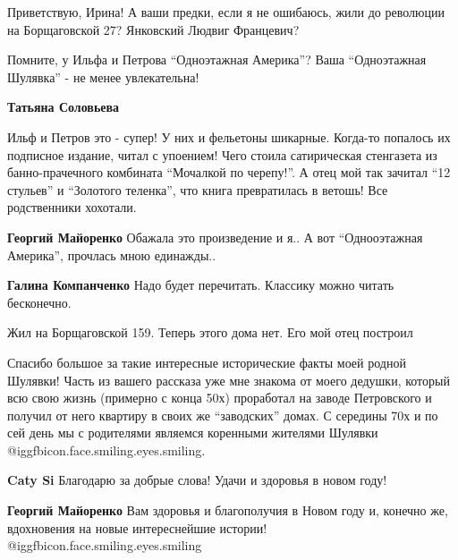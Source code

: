 \begin{itemize}
\begin{itemize}
Приветствую, Ирина! А ваши предки, если я не ошибаюсь, жили до революции на
Борщаговской 27? Янковский Людвиг Францевич?

\end{itemize} %


Помните, у Ильфа и Петрова \enquote{Одноэтажная Америка}? Ваша \enquote{Одноэтажная Шулявка} -
не менее увлекательна!

\begin{itemize} %
\textbf{Татьяна Соловьева} 

Ильф и Петров это - супер! У них и фельетоны шикарные. Когда-то попалось их
подписное издание, читал с упоением! Чего стоила сатирическая стенгазета из
банно-прачечного комбината \enquote{Мочалкой по черепу!}. А отец мой так
зачитал \enquote{12 стульев} и \enquote{Золотого теленка}, что книга
превратилась в ветошь! Все родственники хохотали.


\textbf{Георгий Майоренко} Обажала это произведение и я.. А вот \enquote{Однооэтажная Америка}, прочлась мною единажды..

\textbf{Галина Компанченко} Надо будет перечитать. Классику можно читать бесконечно.
\end{itemize} %

Жил на Борщаговской 159. Теперь этого дома нет. Его мой отец построил


Спасибо большое за такие интересные исторические факты моей родной Шулявки!
Часть из вашего рассказа уже мне знакома от моего дедушки, который всю свою
жизнь (примерно с конца 50х) проработал на заводе Петровского и получил от него
квартиру в своих же \enquote{заводских} домах. С середины 70х и по сей день мы с
родителями являемся коренными жителями Шулявки @igg{fbicon.face.smiling.eyes.smiling}.

\begin{itemize} %
\textbf{Caty Si} Благодарю за добрые слова! Удачи и здоровья в новом году!

\textbf{Георгий Майоренко} Вам здоровья и благополучия в Новом году и, конечно же, вдохновения на новые интереснейшие истории! @igg{fbicon.face.smiling.eyes.smiling} 
\end{itemize} %



\end{itemize}
